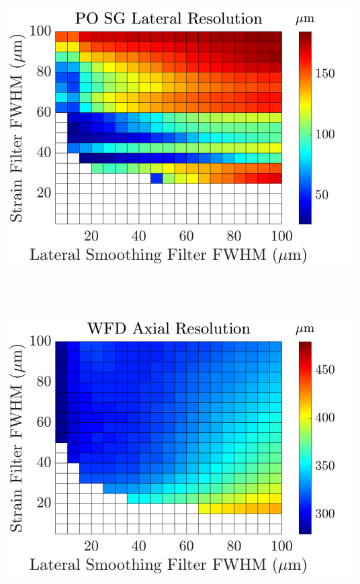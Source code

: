 \begin{figure}[b!]
\begin{subfigure}{0.49\textwidth}
	\end{subfigure}
	\begin{subfigure}{0.49\textwidth}
		\centering
		\includegraphics[width=\textwidth]{imageres_figs/posg_lateral.png}
	\end{subfigure}
	\\
	\begin{subfigure}{0.49\textwidth}
		\centering
		\includegraphics[width=\textwidth]{imageres_figs/wfd_axial.png}
	\end{subfigure}
	\begin{subfigure}{0.49\textwidth}
		\centering

\end{subfigure}
\end{figure}
